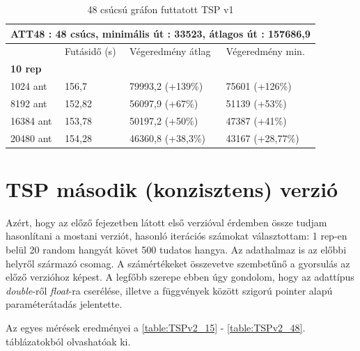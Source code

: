 \begin{table}[htbp!]
	\centering
	\begin{tabular}{|p{2cm}||p{3cm}|p{3.5cm}|p{3.5cm}|}
		\hline
		\multicolumn{4}{|c|}{ATT48 : 48 csúcs, minimális út : 33523, átlagos út : 157686,9} \\
		\hline
		& Futásidő (s) & Végeredmény átlag & Végeredmény min.\\
		\hline
		\textbf{10 rep} & & & \\
		1024 ant & 156,7 & 79993,2 (+139\%) & 75601 (+126\%) \\
		8192 ant & 152,82 & 56097,9 (+67\%) & 51139 (+53\%) \\
		16384 ant & 153,78 & 50197,2 (+50\%) & 47387 (+41\%) \\
		20480 ant & 154,28 & 46360,8 (+38,3\%) & 43167 (+28,77\%) \\
		\hline
	\end{tabular}
	\caption{48 csúcsú gráfon futtatott TSP v1}
	\label{table:TSPv1_48}
\end{table}

\newpage
\newpage

\section{TSP második (konzisztens) verzió}
Azért, hogy az előző fejezetben látott első verzióval érdemben össze tudjam hasonlítani a mostani verziót, hasonló iterációs számokat választottam: 1 rep-en belül 20 random hangyát követ 500 tudatos hangya. Az adathalmaz is az előbbi \cite{TSPdataset} helyről származó csomag. A számértékeket összevetve szembetűnő a gyorsulás az előző verzióhoz képest. A legfőbb szerepe ebben úgy gondolom, hogy az adattípus \textit{double}-ről \textit{float}-ra cserélése, illetve a függvények között szigorú pointer alapú paraméterátadás jelentette.

Az egyes mérések eredményei a \ref{table:TSPv2_15} - \ref{table:TSPv2_48}. táblázatokból olvashatóak ki.

